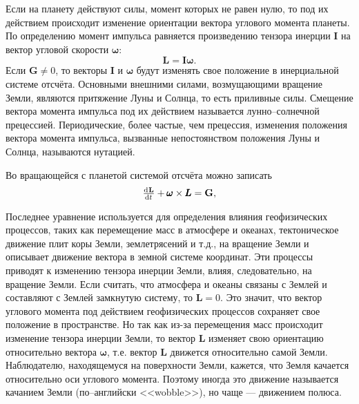 \documentclass[11pt, a4paper,addpoints]{exam}
\theoremstyle{remark}
\begin{document}
    Если на планету действуют силы, момент которых не равен нулю, то под их действием происходит
    изменение ориентации вектора углового момента планеты. По определению момент импульса
    равняется произведению тензора инерции $\pmb{I}$ на вектор угловой скорости $\pmb{\omega}$:
    \begin{equation*}
        \mathbf{L} = \pmb{I}\pmb{\omega}.
    \end{equation*}
    Если $\pmb{G}\neq 0$, то векторы $\pmb{I}$ и $\pmb{\omega}$ будут изменять свое положение в
    инерциальной системе отсчёта. Основными внешними силами, возмущающими вращение Земли, являются
    притяжение Луны и Солнца, то есть приливные силы. Смещение вектора момента импульса под их
    действием называется лунно--солнечной прецессией. Периодические, более частые, чем прецессия, 
    изменения положения вектора момента импульса, вызванные непостоянством положения Луны и Солнца,
    называются нутацией.

    Во вращающейся с планетой системой отсчёта можно записать
    \begin{equation*}
        \od{\mathbf{L}}{t} + \pmb{\omega}\times\pmb{L} = \mathbf{G},
    \end{equation*}

    Последнее уравнение используется для определения влияния геофизических процессов, таких как
    перемещение масс в атмосфере и океанах, тектоническое движение плит коры Земли, землетрясений и
    т.д., на вращение Земли и описывает движение вектора в земной системе координат. Эти процессы
    приводят к изменению тензора инерции Земли, влияя, следовательно, на вращение Земли. Если
    считать, что атмосфера и океаны связаны с Землей и составляют с Землей замкнутую систему, то
    $\pmb{L} = 0$. Это значит, что вектор углового момента под действием геофизических процессов сохраняет свое
    положение в пространстве. Но так как из-за перемещения масс происходит изменение тензора инерции
    Земли, то вектор $\pmb{L}$ изменяет свою ориентацию относительно вектора $\pmb{\omega}$, т.е.
    вектор $\pmb{L}$ движется относительно самой Земли. Наблюдателю, находящемуся на поверхности Земли, кажется, что Земля
    качается относительно оси углового момента. Поэтому иногда это движение называется качанием
    Земли (по--английски <<wobble>>), но чаще --- движением полюса\cite{Zharov2006}.
\end{document}
